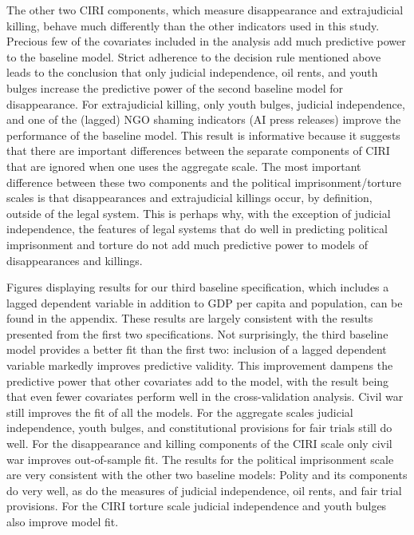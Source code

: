 \documentclass[12pt]{article}
\begin{document}
The other two CIRI components, which measure disappearance and extrajudicial killing, behave much differently than the other indicators used in this study. Precious few of the covariates included in the analysis add much predictive power to the baseline model. Strict adherence to the decision rule mentioned above leads to the conclusion that only judicial independence, oil rents, and youth bulges increase the predictive power of the second baseline model for disappearance. For extrajudicial killing, only youth bulges, judicial independence, and one of the (lagged) NGO shaming  indicators (AI press releases) improve the performance of the baseline model. This result is informative because it suggests that there are important differences between the separate components of CIRI that are ignored when one uses the aggregate scale. The most important difference between these two components and the political imprisonment/torture scales is that disappearances and extrajudicial killings occur, by definition, outside of the legal system. This is perhaps why, with the exception of judicial independence, the features of legal systems that do well in predicting political imprisonment and torture do not add much predictive power to models of disappearances and killings. 

Figures displaying results for our third baseline specification, which includes a lagged dependent variable in addition to GDP per capita and population, can be found in the appendix. These results are largely consistent with the results presented from the first two specifications. Not surprisingly, the third baseline model provides a better fit than the first two: inclusion of a lagged dependent variable markedly improves predictive validity. This improvement dampens the predictive power that other covariates add to the model, with the result being that even fewer covariates perform well in the cross-validation analysis. Civil war still improves the fit of all the models. For the aggregate scales judicial independence, youth bulges, and constitutional provisions for fair trials still do well. For the disappearance and killing components of the CIRI scale only civil war improves out-of-sample fit. The results for the political imprisonment scale are very consistent with the other two baseline models: Polity and its components do very well, as do the measures of judicial independence, oil rents, and fair trial provisions. For the CIRI torture scale judicial independence and youth bulges also improve model fit. 
\end{document}
